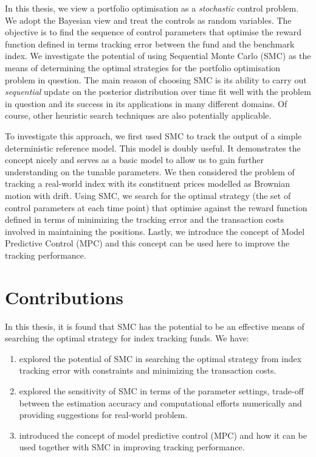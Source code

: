 In this thesis, we view a portfolio optimisation as a \emph{stochastic} control problem. We adopt the Bayesian view and treat the controls as random variables. The objective is to find the sequence of control parameters that optimise the reward function defined in terms tracking error between the fund and the benchmark index. We investigate the potential of using Sequential Monte Carlo (SMC) as the means of determining the optimal strategies for the portfolio optimisation problem in question. The main reason of choosing SMC is its ability to carry out \emph{sequential} update on the posterior distribution over time fit well with the problem in question and its success in its applications in many different domains. Of course, other heuristic search techniques are also potentially applicable.

To investigate this approach, we first used SMC to track the output of a simple deterministic reference model. This model is doubly useful. It demonstrates the concept nicely and serves as a basic model to allow us to gain further understanding on the tunable parameters. We then considered the problem of tracking a real-world index with its constituent prices modelled as Brownian motion with drift. Using SMC, we search for the optimal strategy (the set of control parameters at each time point) that optimise against the reward function defined in terms of minimizing the tracking error and the transaction costs involved in maintaining the positions. Lastly, we introduce the concept of Model Predictive Control (MPC) and this concept can be used here to improve the tracking performance.

\section{Contributions}
In this thesis, it is found that SMC has the potential to be an effective means of searching the optimal strategy for index tracking funds. We have:
\begin{enumerate}
\item explored the potential of SMC in searching the optimal strategy from index tracking error with constraints and minimizing the transaction costs.
\item explored the sensitivity of SMC in terms of the parameter settings, trade-off between the estimation accuracy and computational efforts numerically and providing suggestions for real-world problem.
\item introduced the concept of model predictive control (MPC) and how it can be used together with SMC in improving tracking performance.
\end{enumerate}

